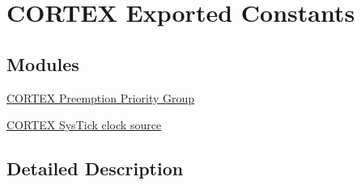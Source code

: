 \hypertarget{group___c_o_r_t_e_x___exported___constants}{\section{C\-O\-R\-T\-E\-X Exported Constants}
\label{group___c_o_r_t_e_x___exported___constants}
}
\subsection*{Modules}
\begin{DoxyCompactItemize}
\item 
\hyperlink{group___c_o_r_t_e_x___preemption___priority___group}{C\-O\-R\-T\-E\-X Preemption Priority Group}
\item 
\hyperlink{group___c_o_r_t_e_x___sys_tick__clock__source}{C\-O\-R\-T\-E\-X Sys\-Tick clock source}
\end{DoxyCompactItemize}


\subsection{Detailed Description}
